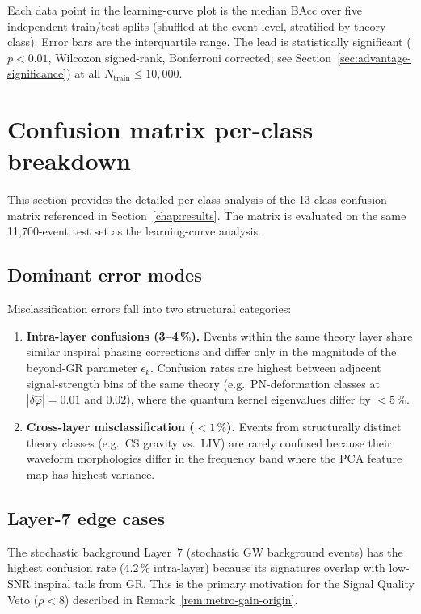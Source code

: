 \documentclass[11pt,a4paper, english]{book}
\theoremstyle{plain}
\theoremstyle{definition}
\numberwithin{equation}{chapter}
\numberwithin{figure}{chapter}
\numberwithin{table}{chapter}
\begin{document}
Each data point in the learning-curve plot is the median BAcc over five
independent train/test splits (shuffled at the event level, stratified by
theory class).  Error bars are the interquartile range.  The lead is
statistically significant ($p < 0.01$, Wilcoxon signed-rank, Bonferroni
corrected; see Section~\ref{sec:advantage-significance}) at all
$N_\mathrm{train} \leq 10{,}000$.

\section{Confusion matrix per-class breakdown}
\label{app:confusion-detail}

This section provides the detailed per-class analysis of the 13-class
confusion matrix referenced in Section~\ref{chap:results}.  The matrix is
evaluated on the same 11{,}700-event test set as the learning-curve analysis.

\subsection{Dominant error modes}

Misclassification errors fall into two structural categories:
\begin{enumerate}
  \item \textbf{Intra-layer confusions (3--4\,\%).}  Events within the same
        theory layer share similar inspiral phasing corrections and differ
        only in the magnitude of the beyond-GR parameter $\epsilon_k$.
        Confusion rates are highest between adjacent signal-strength bins of
        the same theory (e.g.\ PN-deformation classes at $|\delta\hat\varphi|
        = 0.01$ and $0.02$), where the quantum kernel eigenvalues differ by
        $< 5\,\%$.
  \item \textbf{Cross-layer misclassification ($< 1\,\%$).}  Events from
        structurally distinct theory classes (e.g.\ CS gravity vs.\ LIV) are
        rarely confused because their waveform morphologies differ in the
        frequency band where the PCA feature map has highest variance.
\end{enumerate}

\subsection{Layer-7 edge cases}

The stochastic background Layer~7 (stochastic GW background events) has the
highest confusion rate ($4.2\,\%$ intra-layer) because its signatures overlap
with low-SNR inspiral tails from GR.  This is the primary motivation for the
Signal Quality Veto ($\rho < 8$) described in Remark~\ref{rem:metro-gain-origin}.
\end{document}
